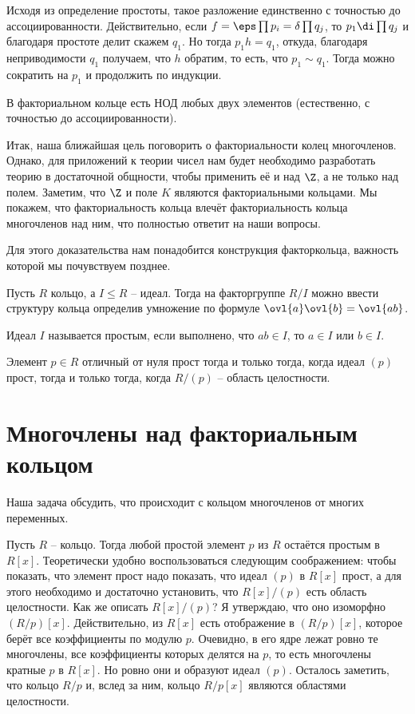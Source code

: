 \rm Исходя из определение простоты, такое разложение единственно с точностью до ассоциированности. Действительно, если $f=\eps\prod p_i= \delta \prod q_j$, то $p_1 \di \prod q_j$ и благодаря простоте делит скажем $q_1$. Но тогда $p_1h=q_1$, откуда, благодаря неприводимости $q_1$ получаем, что $h$ обратим, то есть, что $p_1 \sim q_1$. Тогда можно сократить на $p_1$ и продолжить по индукции.
\erm


\rm В факториальном кольце есть НОД любых двух элементов (естественно, с точностью до ассоциированности).
\erm


Итак, наша ближайшая цель поговорить о факториальности колец многочленов. Однако, для приложений к теории чисел нам будет необходимо разработать теорию в достаточной общности, чтобы применить её и над $\Z$, а не только над полем. Заметим, что $\Z$ и поле $K$ являются факториальными кольцами. Мы покажем, что факториальность кольца влечёт факториальность кольца многочленов над ним, что полностью ответит на наши вопросы.

Для этого доказательства нам понадобится конструкция факторкольца, важность которой мы почувствуем позднее.

\dfn Пусть $R$ кольцо, а $I\leq R$ -- идеал. Тогда на факторгруппе $R/I$ можно ввести структуру кольца определив умножение по формуле $\ovl{a}\ovl{b}=\ovl{ab}$. 
\edfn

\dfn Идеал $I$ называется простым, если выполнено, что $ab\in I$, то $a\in I$ или $b\in I$.
\edfn

\rm Элемент $p\in R$ отличный от нуля прост тогда и только тогда, когда идеал $(p)$ прост, тогда и только тогда, когда $R/(p)$ -- область целостности.
\erm


\section{Многочлены над факториальным кольцом}

Наша задача обсудить, что происходит с кольцом многочленов от многих переменных.


\lm[Гаусс] Пусть $R$ -- кольцо. Тогда любой простой элемент $p$ из $R$ остаётся простым в $R[x]$.
\proof
Теоретически удобно воспользоваться следующим соображением: чтобы показать, что элемент прост надо показать, что идеал $(p)$ в $R[x]$ прост, а для этого необходимо и достаточно установить, что $R[x]/(p)$ есть область целостности. Как же описать $R[x]/(p)$? Я утверждаю, что оно изоморфно $(R/p)[x]$. Действительно, из $R[x]$ есть отображение в $(R/p)[x]$, которое берёт все коэффициенты по модулю $p$. Очевидно, в его ядре лежат ровно те многочлены, все коэффициенты которых делятся на $p$, то есть многочлены кратные $p$ в $R[x]$. Но ровно они и образуют идеал $(p)$. Осталось заметить, что кольцо $R/p$ и, вслед за ним, кольцо $R/p[x]$ являются областями целостности.

